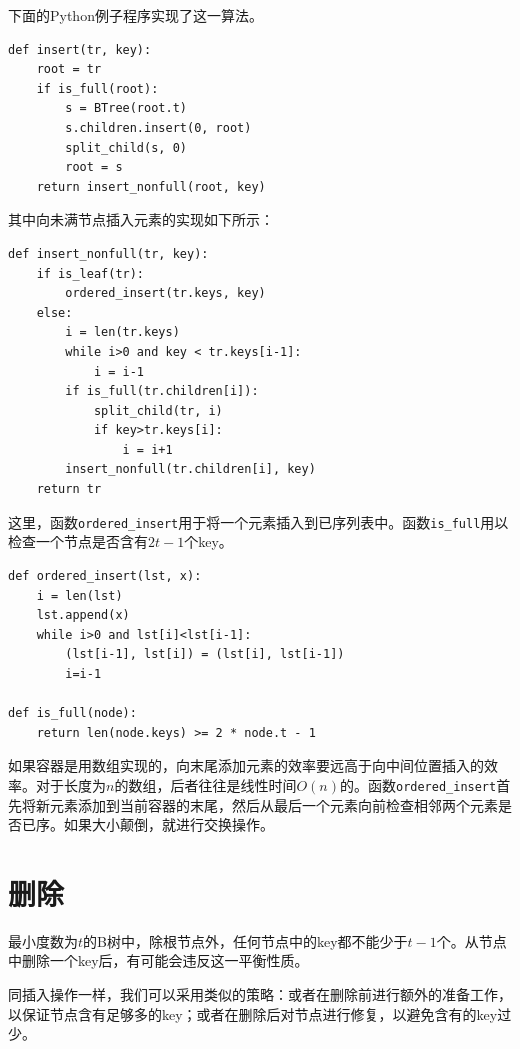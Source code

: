 \documentclass{ctexart}
\begin{document}
下面的Python例子程序实现了这一算法。

\lstset{language=Python}
\begin{lstlisting}
def insert(tr, key):
    root = tr
    if is_full(root):
        s = BTree(root.t)
        s.children.insert(0, root)
        split_child(s, 0)
        root = s
    return insert_nonfull(root, key)
\end{lstlisting}

其中向未满节点插入元素的实现如下所示：

\begin{lstlisting}
def insert_nonfull(tr, key):
    if is_leaf(tr):
        ordered_insert(tr.keys, key)
    else:
        i = len(tr.keys)
        while i>0 and key < tr.keys[i-1]:
            i = i-1
        if is_full(tr.children[i]):
            split_child(tr, i)
            if key>tr.keys[i]:
                i = i+1
        insert_nonfull(tr.children[i], key)
    return tr
\end{lstlisting}

这里，函数\texttt{ordered\_insert}用于将一个元素插入到已序列表中。函数\texttt{is\_full}用以检查一个节点是否含有$2t-1$个key。

\begin{lstlisting}
def ordered_insert(lst, x):
    i = len(lst)
    lst.append(x)
    while i>0 and lst[i]<lst[i-1]:
        (lst[i-1], lst[i]) = (lst[i], lst[i-1])
        i=i-1

def is_full(node):
    return len(node.keys) >= 2 * node.t - 1
\end{lstlisting}

如果容器是用数组实现的，向末尾添加元素的效率要远高于向中间位置插入的效率。对于长度为$n$的数组，后者往往是线性时间$O(n)$的。函数\texttt{ordered\_insert}首先将新元素添加到当前容器的末尾，然后从最后一个元素向前检查相邻两个元素是否已序。如果大小颠倒，就进行交换操作。



\section{删除}

最小度数为$t$的B树中，除根节点外，任何节点中的key都不能少于$t-1$个。从节点中删除一个key后，有可能会违反这一平衡性质。

同插入操作一样，我们可以采用类似的策略：或者在删除前进行额外的准备工作，以保证节点含有足够多的key；或者在删除后对节点进行修复，以避免含有的key过少。
\end{document}

